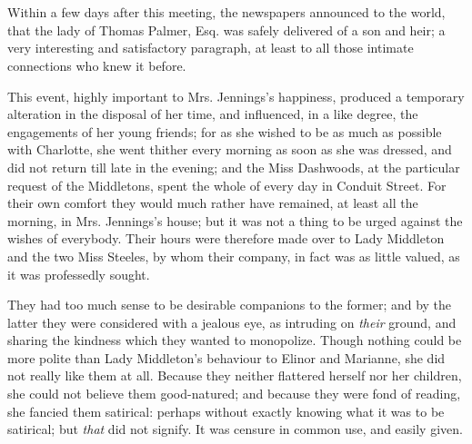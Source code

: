 \chapter{} %

Within a few days after this meeting, the newspapers announced to the world, that the lady of Thomas Palmer, Esq. was safely delivered of a son and heir; a very interesting and satisfactory paragraph, at least to all those intimate connections who knew it before.

This event, highly important to Mrs. Jennings's happiness, produced a temporary alteration in the disposal of her time, and influenced, in a like degree, the engagements of her young friends; for as she wished to be as much as possible with Charlotte, she went thither every morning as soon as she was dressed, and did not return till late in the evening; and the Miss Dashwoods, at the particular request of the Middletons, spent the whole of every day in Conduit Street. For their own comfort they would much rather have remained, at least all the morning, in Mrs. Jennings's house; but it was not a thing to be urged against the wishes of everybody. Their hours were therefore made over to Lady Middleton and the two Miss Steeles, by whom their company, in fact was as little valued, as it was professedly sought.

They had too much sense to be desirable companions to the former; and by the latter they were considered with a jealous eye, as intruding on {\em their} ground, and sharing the kindness which they wanted to monopolize. Though nothing could be more polite than Lady Middleton's behaviour to Elinor and Marianne, she did not really like them at all. Because they neither flattered herself nor her children, she could not believe them good-natured; and because they were fond of reading, she fancied them satirical: perhaps without exactly knowing what it was to be satirical; but {\em that} did not signify. It was censure in common use, and easily given.

